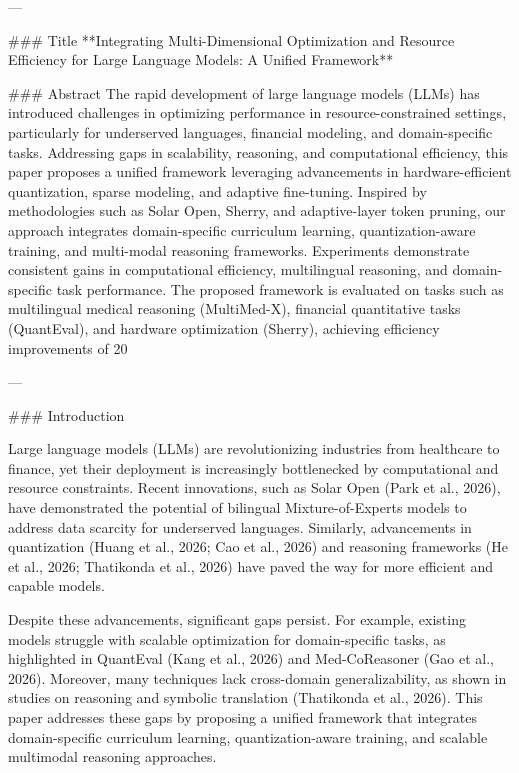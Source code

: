 ---

### Title
**Integrating Multi-Dimensional Optimization and Resource Efficiency for Large Language Models: A Unified Framework**

### Abstract
The rapid development of large language models (LLMs) has introduced challenges in optimizing performance in resource-constrained settings, particularly for underserved languages, financial modeling, and domain-specific tasks. Addressing gaps in scalability, reasoning, and computational efficiency, this paper proposes a unified framework leveraging advancements in hardware-efficient quantization, sparse modeling, and adaptive fine-tuning. Inspired by methodologies such as Solar Open, Sherry, and adaptive-layer token pruning, our approach integrates domain-specific curriculum learning, quantization-aware training, and multi-modal reasoning frameworks. Experiments demonstrate consistent gains in computational efficiency, multilingual reasoning, and domain-specific task performance. The proposed framework is evaluated on tasks such as multilingual medical reasoning (MultiMed-X), financial quantitative tasks (QuantEval), and hardware optimization (Sherry), achieving efficiency improvements of 20%

---

### Introduction

Large language models (LLMs) are revolutionizing industries from healthcare to finance, yet their deployment is increasingly bottlenecked by computational and resource constraints. Recent innovations, such as Solar Open (Park et al., 2026), have demonstrated the potential of bilingual Mixture-of-Experts models to address data scarcity for underserved languages. Similarly, advancements in quantization (Huang et al., 2026; Cao et al., 2026) and reasoning frameworks (He et al., 2026; Thatikonda et al., 2026) have paved the way for more efficient and capable models.

Despite these advancements, significant gaps persist. For example, existing models struggle with scalable optimization for domain-specific tasks, as highlighted in QuantEval (Kang et al., 2026) and Med-CoReasoner (Gao et al., 2026). Moreover, many techniques lack cross-domain generalizability, as shown in studies on reasoning and symbolic translation (Thatikonda et al., 2026). This paper addresses these gaps by proposing a unified framework that integrates domain-specific curriculum learning, quantization-aware training, and scalable multimodal reasoning approaches.

